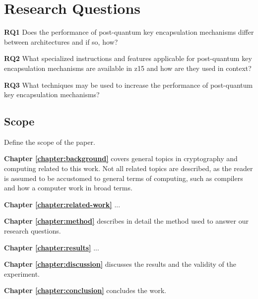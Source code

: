 \section{Research Questions}
\label{section:introduction:research-questions}

\noindent\textbf{RQ1} Does the performance of \gls{post-quantum} key encapsulation mechanisms differ between architectures and if so, how?\label{rq1}\hfill\par
\noindent\textbf{RQ2} What specialized instructions and features applicable for \gls{post-quantum} key encapsulation mechanisms are available in \gls{z15} and how are they used in context?\label{rq2}\hfill\par
\noindent\textbf{RQ3} What techniques may be used to increase the performance of \gls{post-quantum} key encapsulation mechanisms?\label{rq3}\hfill\par

\subsection{Scope}

Define the scope of the paper.



\noindent\textbf{Chapter \ref{chapter:background}} covers general topics in cryptography and computing related to this work. Not all related topics are described, as the reader is assumed to be accustomed to general terms of computing, such as compilers and how a computer work in broad terms.

\noindent\textbf{Chapter \ref{chapter:related-work}} ...

\noindent\textbf{Chapter \ref{chapter:method}} describes in detail the method used to answer our research questions.

\noindent\textbf{Chapter \ref{chapter:results}} ...

\noindent\textbf{Chapter \ref{chapter:discussion}} discusses the results and the validity of the experiment.

\noindent\textbf{Chapter \ref{chapter:conclusion}} concludes the work.